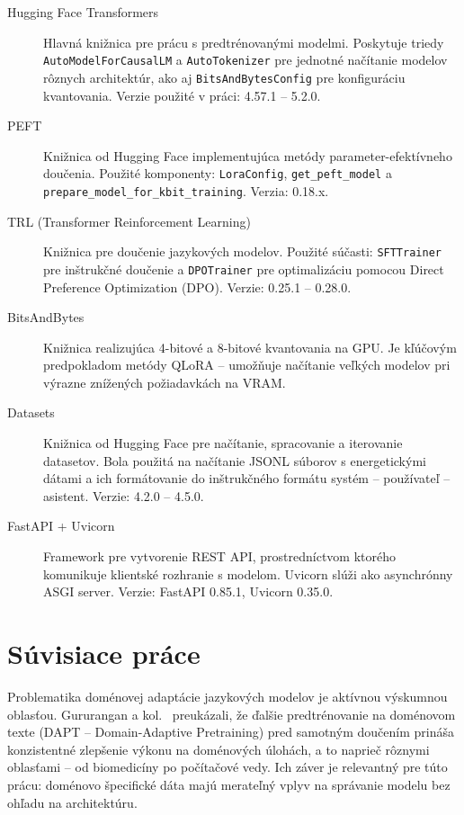 \begin{description}
    \item[Hugging Face Transformers] Hlavná knižnica pre prácu s predtrénovanými modelmi. Poskytuje triedy \texttt{AutoModelForCausalLM} a \texttt{AutoTokenizer} pre jednotné načítanie modelov rôznych architektúr, ako aj \texttt{BitsAndBytesConfig} pre konfiguráciu kvantovania. Verzie použité v práci: 4.57.1 -- 5.2.0.

    \item[PEFT] Knižnica od Hugging Face implementujúca metódy parameter-efektívneho doučenia. Použité komponenty: \texttt{LoraConfig}, \texttt{get\_\allowbreak peft\_model} a \texttt{prepare\_model\_\allowbreak for\_kbit\_\allowbreak training}. Verzia: 0.18.x.

    \item[TRL (Transformer Reinforcement Learning)] Knižnica pre doučenie jazykových modelov. Použité súčasti: \texttt{SFTTrainer} pre inštrukčné doučenie a \texttt{DPOTrainer} pre optimalizáciu pomocou Direct Preference Optimization (DPO). Verzie: 0.25.1 -- 0.28.0.

    \item[BitsAndBytes] Knižnica realizujúca 4-bitové a 8-bitové kvantovania na GPU. Je kľúčovým predpokladom metódy QLoRA -- umožňuje načítanie veľkých modelov pri výrazne znížených požiadavkách na VRAM.

    \item[Datasets] Knižnica od Hugging Face pre načítanie, spracovanie a iterovanie datasetov. Bola použitá na načítanie JSONL súborov s energetickými dátami a ich formátovanie do inštrukčného formátu systém -- používateľ -- asistent. Verzie: 4.2.0 -- 4.5.0.

    \item[FastAPI + Uvicorn] Framework pre vytvorenie REST API, prostredníctvom ktorého komunikuje klientské rozhranie s modelom. Uvicorn slúži ako asynchrónny ASGI server. Verzie: FastAPI 0.85.1, Uvicorn 0.35.0.
\end{description}


\section{Súvisiace práce}

Problematika doménovej adaptácie jazykových modelov je aktívnou výskumnou oblasťou. Gururangan a kol.~\cite{Gururangan2020DontStop} preukázali, že ďalšie predtrénovanie na doménovom texte (DAPT -- Domain-Adaptive Pretraining) pred samotným doučením prináša konzistentné zlepšenie výkonu na doménových úlohách, a to naprieč rôznymi oblasťami -- od biomedicíny po počítačové vedy. Ich záver je relevantný pre túto prácu: doménovo špecifické dáta majú merateľný vplyv na správanie modelu bez ohľadu na architektúru.

